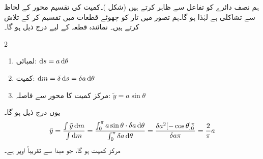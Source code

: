 ہم نصف دائرے کو تفاعل  سے ظاہر کرتے ہیں (شکل )۔کمیت کی تقسیم محور  کے لحاظ سے تشاکلی ہے لہٰذا   ہو گا۔ہم تصور میں تار کو چھوٹے قطعات میں تقسیم کر کے  تلاش کرتے ہیں۔ نمائندہ قطعہ کے لیے درج ذیل ہو گا۔
\begin{multicols}{2}
\begin{enumerate}[]
\item
لمبائی:\quad
$\dif s=a\dif \theta$
\item
کمیت:\quad
$\dif m=\delta \dif s=\delta a\dif \theta$
\item
مرکز کمیت کا محور  سے فاصلہ:\quad
$\tilde{y}=a\sin\theta$ 
\end{enumerate}
\end{multicols}
یوں درج ذیل ہو گا۔
\begin{align*}
\bar{y}=\frac{\int\tilde{y}\dif m}{\int\dif m}=\frac{\int_0^{\pi}a\sin\theta\cdot\delta a\dif \theta}{\int_0^{\pi}\delta a\dif \theta}=\frac{\delta a^2[-\cos\theta]_0^{\pi}}{\delta a\pi}=\frac{2}{\pi}a
\end{align*}
مرکز کمیت  ہو گا، جو مبدا سے تقریباً  اوپر ہے۔
